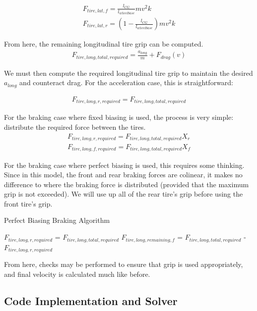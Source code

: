 \documentclass{article}
\begin{document}
\begin{align}
	F_{tire,lat,f} = \frac{l_{CG}}{l_{wheelbase}} m v^2 k \\ 
	F_{tire,lat,r} = (1-\frac{l_{CG}}{l_{wheelbase}}) m v^2 k
\end{align}

From here, the remaining longitudinal tire grip can be computed.
\begin{align}
	F_{tire,long,total,required} = \frac{a_{long}}{m} + F_{drag}(v)
\end{align}

We must then compute the required longitudinal tire grip to maintain the desired $a_{long}$ and counteract drag. For the acceleration case, this is straightforward:

\begin{align}
	F_{tire,long,r,required} = F_{tire,long,total,required}
\end{align}

For the braking case where fixed biasing is used, the process is very simple: distribute the required force between the tires.
\begin{align}
	F_{tire,long,r,required} = F_{tire,long,total,required} X_r \\
	F_{tire,long,f,required} = F_{tire,long,total,required} X_f
\end{align}

For the braking case where perfect biasing is used, this requires some thinking. Since in this model, the front and rear braking forces are colinear, it makes no difference to where the braking force is distributed (provided that the maximum grip is not exceeded). We will use up all of the rear tire's grip before using the front tire's grip.

\begin{algorithm}[H]
\caption{Perfect Biasing Braking Algorithm}
\begin{algorithmic}[1]
	\State $F_{tire,long,r,required}$ = $F_{tire,long,total,required}$
	\State	$F_{tire,long,remaining,f}$ = $F_{tire,long,total,required}$ - $F_{tire,long,r,required}$
	\EndIf
\end{algorithmic}
\end{algorithm}

From here, checks may be performed to ensure that grip is used appropriately, and final velocity is calculated much like before.



\subsection{Code Implementation and Solver}
\end{document}
